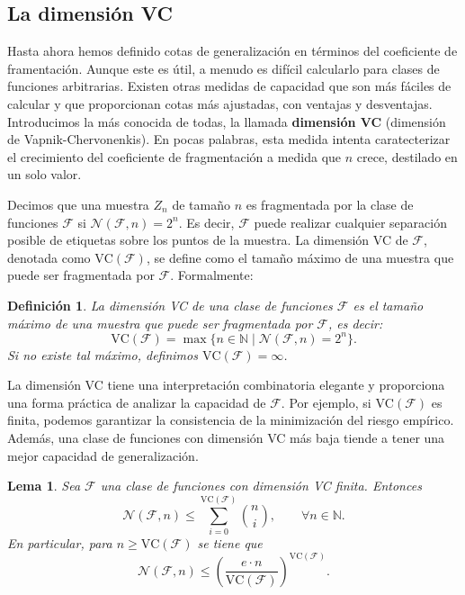\documentclass{report}
\newtheorem{lem}{Lema}[subsection]
\newtheorem{dfn}{Definición}[subsection]
\begin{document}
\subsection{La dimensión VC}

Hasta ahora hemos definido cotas de generalización en términos del coeficiente de framentación.
Aunque este es útil, a menudo es difícil calcularlo para clases de funciones arbitrarias. Existen otras medidas de capacidad
que son más fáciles de calcular y que proporcionan cotas más ajustadas, con ventajas y desventajas.
Introducimos la más conocida de todas, la llamada \textbf{dimensión VC} (dimensión de Vapnik-Chervonenkis). En pocas palabras,
esta medida intenta caratecterizar el crecimiento del coeficiente de fragmentación a medida que $n$ crece, destilado en un 
solo valor.\newline

Decimos que una muestra \(Z_n\) de tamaño \(n\) es fragmentada por la clase de funciones 
\(\mathcal{F}\) si \(\mathcal{N}(\mathcal{F}, n) = 2^n\). Es decir, \(\mathcal{F}\) puede realizar cualquier separación posible de etiquetas sobre 
los puntos de la muestra. La dimensión VC de \(\mathcal{F}\), denotada como \(\text{VC}(\mathcal{F})\), se define como el tamaño 
máximo de una muestra que puede ser fragmentada por \(\mathcal{F}\). Formalmente:\newline

\begin{dfn}
La dimensión VC de una clase de funciones \(\mathcal{F}\) es el tamaño máximo de una muestra que puede ser fragmentada por \(\mathcal{F}\), es decir:
\[
\text{VC}(\mathcal{F}) = \max \{n \in \mathbb{N} \mid \mathcal{N}(\mathcal{F}, n) = 2^n\}. 
\]
Si no existe tal máximo, definimos \(\text{VC}(\mathcal{F}) = \infty\).\newline
\end{dfn}

La dimensión VC tiene una interpretación combinatoria 
elegante y proporciona una forma práctica de analizar la capacidad de \(\mathcal{F}\). Por ejemplo, si \(\text{VC}(\mathcal{F})\) 
es finita, podemos garantizar la consistencia de la minimización del riesgo empírico. Además, una clase de funciones 
con dimensión VC más baja tiende a tener una mejor capacidad de generalización.\newline

\begin{lem}\label{def:cota combinatoria de dimensión VC}
    Sea $\mathcal{F}$ una clase de funciones con dimensión VC finita. Entonces
    \[
    \mathcal{N}(\mathcal{F}, n) \leq \sum_{i=0}^{\text{VC}(\mathcal{F})} \binom{n}{i} , \qquad \forall n \in \mathbb{N}.
    \]
    En particular, para $n\geq \text{VC}(\mathcal{F})$ se tiene que 
    \[
    \mathcal{N}(\mathcal{F}, n) \leq \left(\frac{e\cdot n}{\text{VC}(\mathcal{F})}\right)^{\text{VC}(\mathcal{F})}.
    \]
\end{lem}
\end{document}
